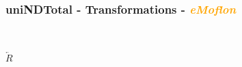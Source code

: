 \documentclass{beamer}
\begin{document}
\begin{frame}
\frametitle{uniNDTotal - \textbf{Transformations} - \textbf{\textit{\textcolor{orange}{eMoflon}}}}
\begin{figure}[ht]
\begin{mdframed}
    \centering
    \mbox{\qquad\qquad\qquad
          }
\end{mdframed}          
    \label{fig:T1}
\end{figure}

\begin{center}
$\overleftarrow{R}$
\end{center}

\begin{figure}[ht]
    \centering
    \mbox{
          }
    \label{fig:T2}
\end{figure}

\end{frame}
\end{document}
